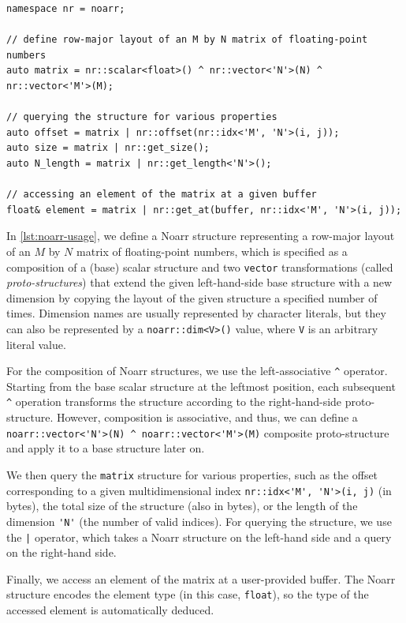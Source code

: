 \begin{lstlisting}[caption={Example of a Noarr structure usage}, label={lst:noarr-usage}, basicstyle=\ttfamily\scriptsize]
namespace nr = noarr;

// define row-major layout of an M by N matrix of floating-point numbers
auto matrix = nr::scalar<float>() ^ nr::vector<'N'>(N) ^ nr::vector<'M'>(M);

// querying the structure for various properties
auto offset = matrix | nr::offset(nr::idx<'M', 'N'>(i, j));
auto size = matrix | nr::get_size();
auto N_length = matrix | nr::get_length<'N'>();

// accessing an element of the matrix at a given buffer
float& element = matrix | nr::get_at(buffer, nr::idx<'M', 'N'>(i, j));
\end{lstlisting}

In \cref{lst:noarr-usage}, we define a Noarr structure representing a row-major layout of an $M$ by $N$ matrix of floating-point numbers, which is specified as a composition of a (base) scalar structure and two \lstinline{vector} transformations (called \emph{proto-structures}) that extend the given left-hand-side base structure with a new dimension by copying the layout of the given structure a specified number of times. Dimension names are usually represented by character literals, but they can also be represented by a \lstinline{noarr::dim<V>()} value, where \lstinline{V} is an arbitrary literal value.

For the composition of Noarr structures, we use the left-associative \lstinline{^} operator. Starting from the base scalar structure at the leftmost position, each subsequent \lstinline{^} operation transforms the structure according to the right-hand-side proto-structure. However, composition is associative, and thus, we can define a \lstinline{noarr::vector<'N'>(N) ^ noarr::vector<'M'>(M)} composite proto-structure and apply it to a base structure later on.

We then query the \lstinline{matrix} structure for various properties, such as the offset corresponding to a given multidimensional index \lstinline{nr::idx<'M', 'N'>(i, j)} (in bytes), the total size of the structure (also in bytes), or the length of the dimension \lstinline{'N'} (the number of valid indices). For querying the structure, we use the \lstinline{|} operator, which takes a Noarr structure on the left-hand side and a query on the right-hand side.

Finally, we access an element of the matrix at a user-provided buffer. The Noarr structure encodes the element type (in this case, \lstinline{float}), so the type of the accessed element is automatically deduced.

